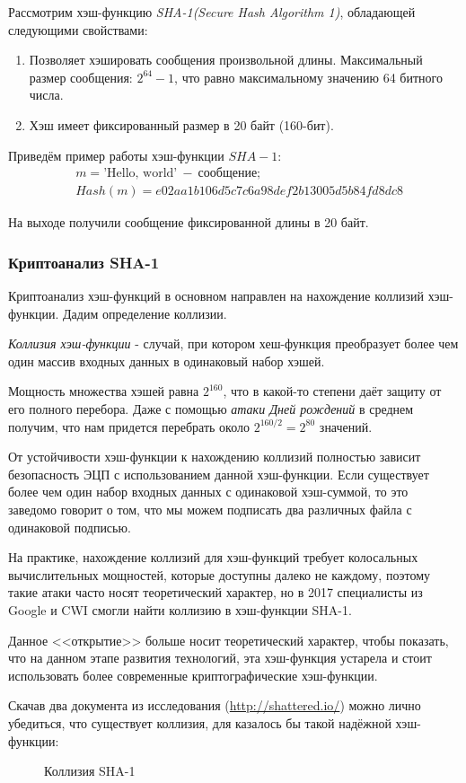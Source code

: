 Рассмотрим хэш-функцию \emph{SHA-1(Secure Hash Algorithm 1)}, обладающей следующими свойствами:
\begin{enumerate}
	\item Позволяет хэшировать сообщения произвольной длины. Максимальный размер сообщения: $2^{64} - 1$, что равно максимальному значению 64 битного числа.
	\item Хэш имеет фиксированный размер в 20 байт (160-бит).
\end{enumerate}

Приведём пример работы хэш-функции $SHA-1$:
\begin{align*}
	& m = \text{'Hello, world'}\  - \  \text{сообщение}; \\
	& Hash(m) = e02aa1b106d5c7c6a98def2b13005d5b84fd8dc8
\end{align*}

На выходе получили сообщение фиксированной длины в 20 байт.

\subsubsection{Криптоанализ SHA-1}

Криптоанализ хэш-функций в основном направлен на нахождение коллизий хэш-функции. Дадим определение коллизии.

\emph{Коллизия хэш-функции} - случай, при котором хеш-функция преобразует более чем один массив входных данных в одинаковый набор хэшей. 

Мощность множества хэшей равна $2^{160}$, что в какой-то степени даёт защиту от его полного перебора.
Даже с помощью \emph{атаки Дней рождений} в среднем получим, что нам придется перебрать около $2^{160/2} = 2^{80}$ значений.

От устойчивости хэш-функции к нахождению коллизий полностью зависит безопасность ЭЦП с использованием данной хэш-функции.
Если существует более чем один набор входных данных с одинаковой хэш-суммой, то это заведомо говорит о том, что мы можем подписать два различных файла с
одинаковой подписью.

На практике, нахождение коллизий для хэш-функций требует колосальных вычислительных мощностей, которые доступны далеко не каждому, поэтому такие атаки часто носят теоретический характер,
но в 2017 специалисты из Google и CWI смогли найти коллизию в хэш-функции SHA-1.

Данное <<открытие>> больше носит теоретический характер, чтобы показать, что на данном этапе развития технологий, эта хэш-функция устарела и стоит использовать более современные криптографические хэш-функции.

Скачав два документа из исследования (\url{http://shattered.io/}) можно лично убедиться, что существует коллизия, для казалось бы такой надёжной хэш-функции:
\begin{figure}[h!]
  \caption{Коллизия SHA-1}
\end{figure}